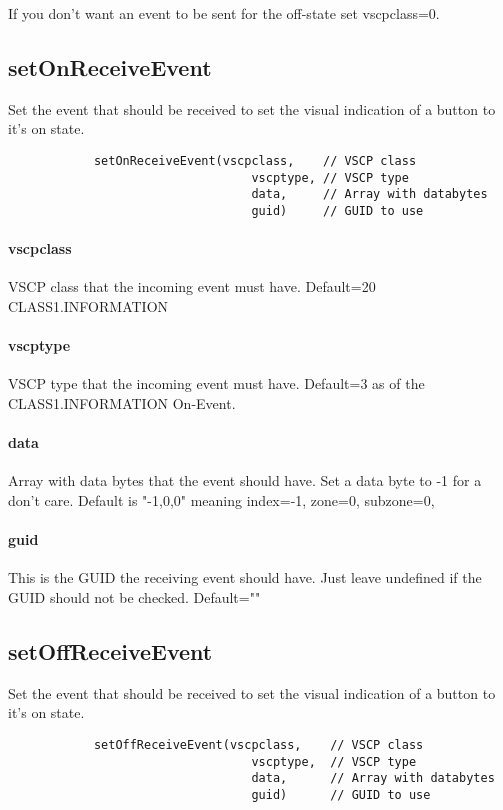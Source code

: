 \documentclass{article}
\begin{document}
        If you don't want an event to be sent for the off-state set vscpclass=0.
        
        \subsection*{setOnReceiveEvent}
        Set the event that should be received to set the visual indication of
        a button to it's on state.
        \begin{verbatim}
            setOnReceiveEvent(vscpclass,    // VSCP class
                                  vscptype, // VSCP type
                                  data,     // Array with databytes   
                                  guid)     // GUID to use
        \end{verbatim}
        \paragraph*{vscpclass}
        VSCP class that the incoming event must have. Default=20 CLASS1.INFORMATION
        \paragraph*{vscptype}
        VSCP type that the incoming event must have. Default=3 as of the 
        CLASS1.INFORMATION On-Event.
        \paragraph*{data}
        Array with data bytes that the event should have. Set a data byte to -1
        for a don't care. Default
        is "-1,0,0" meaning index=-1, zone=0, subzone=0,
        \paragraph*{guid}
        This is the GUID the receiving event should have. Just leave undefined
        if the GUID should not be checked. Default=""
        
        \subsection*{setOffReceiveEvent}
        Set the event that should be received to set the visual indication of
        a button to it's on state.
        \begin{verbatim}
            setOffReceiveEvent(vscpclass,    // VSCP class
                                  vscptype,  // VSCP type
                                  data,      // Array with databytes   
                                  guid)      // GUID to use
        \end{verbatim}
\end{document}
